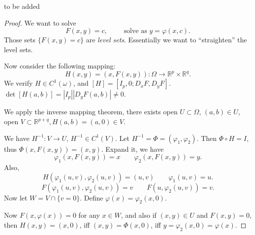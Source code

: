 
\begin{theorem}
	to be added
\end{theorem}
\begin{proof}
	We want to solve
	\[
		F(x,y) = c, \qquad \text{ solve as }y = \varphi(x,c)
	.\] 
	Those sets $\{F(x,y) = c\} $ are \textit{level sets}. Essentially we want to ``straighten'' the level sets. 

	Now consider the following mapping:
	\[
		H(x,y) = (x,F(x,y)): \Omega \to \mathbb{R}^p \times \mathbb{R}^q
	.\] 
We verify  $H \in C^1(\omega)$, and $[H] = \left[ I_p, 0; D_xF, D_y F \right] $. $\operatorname{det}[H(a,b)] = |I_p| |D_yF(a,b)| \neq 0$.
	
We apply the inverse mapping theorem, there exists open $U \subset \Omega$, $(a,b) \in U$, open $V \subset \mathbb{R}^{p + q}, H(a,b) = (a,0) \in V$.

We have $H^{-1} : V \to  U$, $H^{-1}  \in C^1(V)$. Let $H^{-1}  = \Phi = (\varphi_1, \varphi_2)$.  Then $\Phi \circ H = I$, thus $\Phi(x, F(x,y)) = (x,y)$. Expand it, we have
\[
	\varphi_1(x, F(x,y)) = x \qquad \varphi_2(x, F(x,y)) = y
.\] 
Also,
\[
	H(\varphi_1(u,v), \varphi_2(u,v)) = (u,v)\qquad
	\varphi_1(u,v) = u
.\] 
\[
	F(\varphi_1(u,v), \varphi_2(u,v)) = v \qquad F(u,\varphi_2(u,v)) = v
.\] 
Now let $W = V \cap  \{v=0\} $. Define $\varphi(x) = \varphi_2(x,0)$.

Now $F(x, \varphi(x)) = 0$ for any $x \in W$, and also if $(x,y) \in U$ and $F(x,y) = 0$, then $H(x,y) = (x, 0)$, iff $(x,y) = \Phi(x,0)$, iff $y = \varphi_2(x,0) = \varphi(x)$.
\end{proof}

